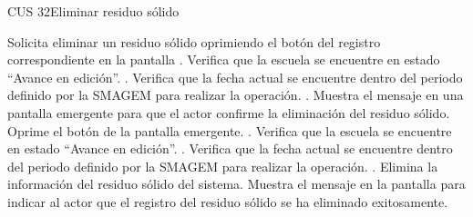 \begin{UseCase}{CUS 32}{Eliminar residuo sólido}


\end{UseCase}

 \begin{UCtrayectoria}
    \UCpaso[\UCactor] Solicita eliminar un residuo sólido oprimiendo el botón \botKo del registro correspondiente en la pantalla .
    \UCpaso[\UCsist] Verifica que la escuela se encuentre en estado ``Avance en edición''. .
    \UCpaso[\UCsist] Verifica que la fecha actual se encuentre dentro del periodo definido por la SMAGEM para realizar la operación. .
    \UCpaso[\UCsist] Muestra el mensaje  en una pantalla emergente para que el actor confirme la eliminación del residuo sólido.
    \UCpaso[\UCactor] Oprime el botón  de la pantalla emergente. .
    \UCpaso[\UCsist] Verifica que la escuela se encuentre en estado ``Avance en edición''. .
    \UCpaso[\UCsist] Verifica que la fecha actual se encuentre dentro del periodo definido por la SMAGEM para realizar la operación. .
    \UCpaso[\UCsist] Elimina la información del residuo sólido del sistema.
    \UCpaso[\UCsist] Muestra el mensaje  en la pantalla  para indicar al actor que el registro del residuo sólido se ha eliminado exitosamente. 
    
 \end{UCtrayectoria}
 
